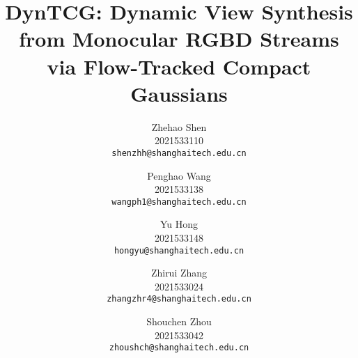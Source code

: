 \documentclass[10pt,twocolumn,letterpaper]{article}
\title{DynTCG: Dynamic View Synthesis from Monocular RGBD Streams via Flow-Tracked Compact Gaussians}
\author{Zhehao Shen\\
2021533110\\
{\tt\small shenzhh@shanghaitech.edu.cn}
\and
Penghao Wang\\
2021533138\\
{\tt\small wangph1@shanghaitech.edu.cn}
\and
Yu Hong\\
2021533148\\
{\tt\small hongyu@shanghaitech.edu.cn}
\and
Zhirui Zhang\\
2021533024\\
{\tt\small zhangzhr4@shanghaitech.edu.cn}
\and
Shouchen Zhou\\
2021533042\\
{\tt\small zhoushch@shanghaitech.edu.cn}
}
\begin{document}
\maketitle
%     
% 
% 





{
    \small
    
    
}

% 
\end{document}
